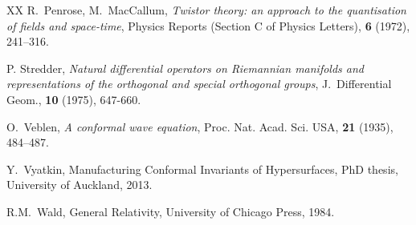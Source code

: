 \documentclass[a4paper,12pt]{amsart}
\theoremstyle{remark}
\begin{document}
\begin{thebibliography}{XX}
 R.\ Penrose, M.\ MacCallum, {\em Twistor
  theory: an approach to the quantisation of fields and space-time},
  Physics Reports (Section C of Physics Letters), {\bf 6} (1972), 
  241--316.
		
 P. Stredder, {\em Natural differential operators on
  Riemannian manifolds and representations of the orthogonal and
  special orthogonal groups}, J.\ Differential Geom., {\bf 10} (1975),
  647-660.


 O.\ Veblen, {\em A conformal wave equation}, Proc. Nat.
		Acad. Sci. USA, {\bf 21} (1935), 484--487.

 Y.\ Vyatkin, Manufacturing Conformal Invariants of
  Hypersurfaces, PhD thesis, University of Auckland, 2013.

 R.M.\ Wald, General Relativity, University of
		Chicago Press, 1984.



\end{thebibliography}
\end{document}
